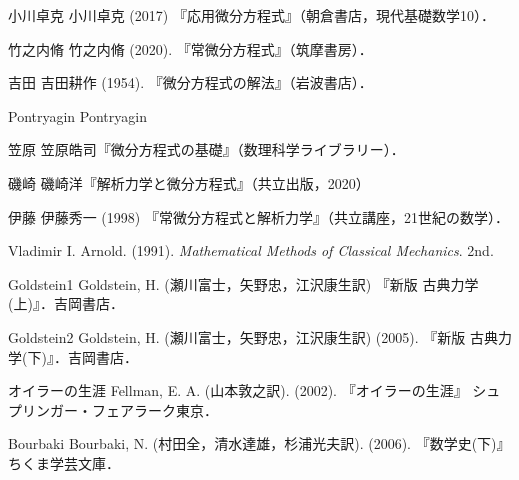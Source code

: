\documentclass[uplatex,dvipdfmx]{jsreport}
\begin{document}

\begin{thebibliography}{99}
    \item{小川卓克}
    小川卓克 (2017) 『応用微分方程式』（朝倉書店，現代基礎数学10）．
    \item{竹之内脩}
    竹之内脩 (2020). 『常微分方程式』（筑摩書房）．
    \item{吉田}
    吉田耕作 (1954). 『微分方程式の解法』（岩波書店）．
    \item{Pontryagin}
    Pontryagin
    \item{笠原}
    笠原皓司『微分方程式の基礎』（数理科学ライブラリー）．

    \item{磯崎}
    磯崎洋『解析力学と微分方程式』（共立出版，2020）
    \item{伊藤}
    伊藤秀一 (1998) 『常微分方程式と解析力学』（共立講座，21世紀の数学）．
    \item
    Vladimir I. Arnold. (1991). \textit{Mathematical Methods of Classical Mechanics}. 2nd.
    \item{Goldstein1}
    Goldstein, H. (瀬川富士，矢野忠，江沢康生訳) 『新版 古典力学(上)』．吉岡書店．
    \item{Goldstein2}
    Goldstein, H. (瀬川富士，矢野忠，江沢康生訳) (2005). 『新版 古典力学(下)』．吉岡書店．

    \item{オイラーの生涯}
    Fellman, E. A. (山本敦之訳). (2002). 『オイラーの生涯』 シュプリンガー・フェアラーク東京．
    \item{Bourbaki}
    Bourbaki, N. (村田全，清水達雄，杉浦光夫訳). (2006). 『数学史(下)』 ちくま学芸文庫．


\end{thebibliography}
\end{document}
